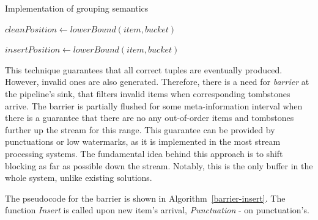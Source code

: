 \begin{algorithm}
\caption{Implementation of grouping semantics}
\label{group-insert}
  \begin{algorithmic}[1]
      \State $cleanPosition \gets lowerBound(item, bucket)$
        \State {}
      \EndFor

      \State {}

        \State {} 
      \EndFor
    \EndFunction

    \State

      \State $insertPosition \gets lowerBound(item, bucket)$
        \State {} 
      \EndFor
      
      \State {}

        \State {} 
      \EndFor
    \EndFunction
  \end{algorithmic}
\end{algorithm}

This technique guarantees that all correct tuples are eventually produced. However, invalid ones are also generated. Therefore, there is a need for {\it barrier} at the pipeline's sink, that filters invalid items when corresponding tombstones arrive. The barrier is partially flushed for some meta-information interval when there is a guarantee that there are no any out-of-order items and tombstones further up the stream for this range. This guarantee can be provided by punctuations or low watermarks, as it is implemented in the most stream processing systems. The fundamental idea behind this approach is to shift blocking as far as possible down the stream. Notably, this is the only buffer in the whole system, unlike existing solutions.

The pseudocode for the barrier is shown in Algorithm~\ref{barrier-insert}. The function {\it Insert} is called upon new item's arrival, {\it Punctuation} - on punctuation's. 

